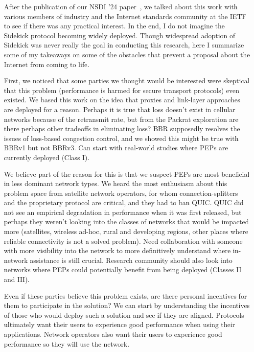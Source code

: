 After the publication of our NSDI '24 paper~\cite{yuan2024sidekick}, we talked
about this work with various members of industry and the Internet standards
community at the IETF to see if there was any practical interest. In the end, I
do not imagine the Sidekick protocol becoming widely deployed. Though
widespread adoption of Sidekick was never really the goal in conducting this
research, here I summarize some of my takeaways on some of the obstacles that
prevent a proposal about the Internet from coming to life.

First, we noticed that some parties we thought would be interested were
skeptical that this problem (performance is harmed for secure transport
protocols) even existed. We based this work on the idea that proxies and
link-layer approaches are deployed for a reason. Perhaps it is true that loss
doesn't exist in cellular networks because of the retransmit rate, but from the
Packrat exploration are there perhaps other tradeoffs in eliminating loss? BBR
supposedly resolves the issues of loss-based congestion control, and we showed
this might be true with BBRv1 but not BBRv3. Can start with real-world studies
where PEPs are currently deployed (Class I).

We believe part of the reason for this is that we suspect PEPs are most
beneficial in less dominant network types. We heard the most enthusiasm about
this problem space from satellite network operators, for whom
connection-splitters and the proprietary protocol are critical, and they had to
ban QUIC.   QUIC did not see an empirical degradation in performance when it
was first released, but perhaps they weren't looking into the classes of
networks that would be impacted more (satellites, wireless ad-hoc, rural and
developing regions, other places where reliable connectivity is not a solved
problem). Need collaboration with someone with more visibility into the network
to more definitively understand where in-network assistance is still crucial.
Research community should also look into networks where PEPs could potentially
benefit from being deployed (Classes II and III).

Even if these parties believe this problem exists, are there personal incentives
for them to participate in the solution? We can start by understanding the
incentives of those who would deploy such a solution and see if they are
aligned. Protocols ultimately want their users to experience good performance
when using their applications. Network operators also want their users to
experience good performance so they will use the network.

